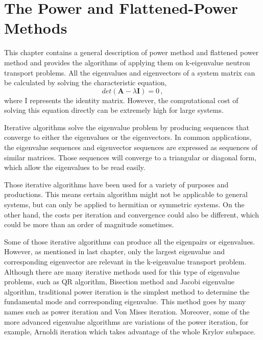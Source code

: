 \cleardoublepage

\chapter{The Power and Flattened-Power Methods}
\label{chapter:PM}

This chapter contains a general description of power method and flattened power method and provides the algorithms of applying them on k-eigenvalue neutron transport problems.
All the eigenvalues and eigenvectors of a system matrix can be calculated by solving the characteristic equation,
\begin{equation}
det(\mathbf{A} -\lambda \mathbf{I} ) = 0 \, ,
\label{eq:characteristic}
\end{equation}
where I represents the identity matrix.
However, the computational cost of solving this equation directly can be extremely high for large systems. 

Iterative algorithms solve the eigenvalue problem by producing sequences that converge to either the eigenvalues or the eigenvectors.
In common applications, the eigenvalue sequences and eigenvector sequences are expressed as sequences of similar matrices. 
Those sequences will converge to a triangular or diagonal form, which allow the eigenvalues to be read easily. 

Those iterative algorithms have been used for a variety of purposes and productions.
This means certain algorithm might not be applicable to general systems, but can only be applied to hermitian or symmetric systems.
On the other hand, the costs per iteration and convergence could also be different, which could be more than an order of magnitude sometimes. 

Some of those iterative algorithms can produce all the eigenpairs or eigenvalues. 
However, as mentioned in last chapter, only the largest eigenvalue and corresponding eigenvector are relevant in the k-eigenvalue transport problem.
Although there are many iterative methods used for this type of eigenvalue problems, such as QR algorithm, Bisection method and Jacobi eigenvalue algorithm, traditional power iteration is the simplest method to determine the fundamental mode and corresponding eigenvalue.
This method goes by many names such as power iteration and Von Mises iteration.
Moreover, some of the more advanced eigenvalue algorithms are variations of the power iteration, for example, Arnoldi iteration which takes advantage of the whole Krylov subspace. 

